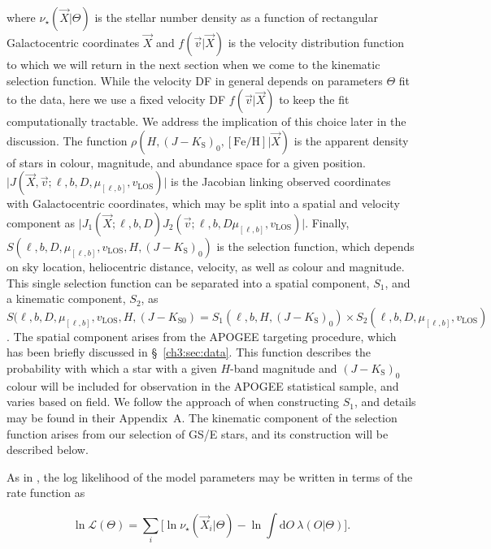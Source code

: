 \noindent where $\nu_{\star}(\vec{X} \vert \Theta)$ is the stellar number density as a function of rectangular Galactocentric coordinates $\vec{X}$ and $f(\vec{v} \vert \vec{X})$ is the velocity distribution function to which we will return in the next section when we come to the kinematic selection function. While the velocity DF in general depends on parameters $\Theta$ fit to the data, here we use a fixed velocity DF $f(\vec{v}\vert \vec{X})$ to keep the fit computationally tractable. We address the implication of this choice later in the discussion. The function $\rho(H, (J-K_\mathrm{S})_{0}, [\mathrm{Fe/H}] \vert \vec{X})$ is the apparent density of stars in colour, magnitude, and abundance space for a given position. $\vert J(\vec{X}, \vec{v}; \ell, b, D, \mu_{[\ell,b]}, v_\mathrm{LOS}) \vert$ is the Jacobian linking observed coordinates with Galactocentric coordinates, which may be split into a spatial and velocity component as $\vert J_{1}(\vec{X}; \ell, b, D) J_{2}( \vec{v}; \ell, b, D \mu_{[\ell,b]}, v_\mathrm{LOS}) \vert$. Finally, $S(\ell, b, D, \mu_{[\ell,b]}, v_\mathrm{LOS}, H, (J-K_\mathrm{S})_{0})$ is the selection function, which depends on sky location, heliocentric distance, velocity, as well as colour and magnitude. This single selection function can be separated into a spatial component, $S_{1}$, and a kinematic component, $S_{2}$, as $S(\ell, b, D, \mu_{[\ell,b]}, v_\mathrm{LOS}, H, (J-K_{\mathrm{S}0}) = S_{1}(\ell, b, H, (J-K_\mathrm{S})_{0}) \times S_{2}(\ell, b, D, \mu_{[\ell,b]}, v_\mathrm{LOS})$. The spatial component arises from the APOGEE targeting procedure, which has been briefly discussed in \S~\ref{ch3:sec:data}. This function describes the probability with which a star with a given $H$-band magnitude and $(J-K_\mathrm{S})_{0}$ colour will be included for observation in the APOGEE statistical sample, and varies based on field. We follow the approach of \cite{mackereth20} when constructing $S_{1}$, and details may be found in their Appendix~A. The kinematic component of the selection function arises from our selection of GS/E stars, and its construction will be described below.

As in \textcite{bovy12d}, the log likelihood of the model parameters may be written in terms of the rate function as

\begin{equation}
\label{ch3:eq:log-likelihood}
	\ln \mathcal{L}(\Theta) = \sum_{i} \big[ \ln \nu_{\star}(\vec{X}_{i} \vert \Theta) - \ln \int \mathrm{d}O\ \lambda(O \vert \Theta) \big].
\end{equation}

